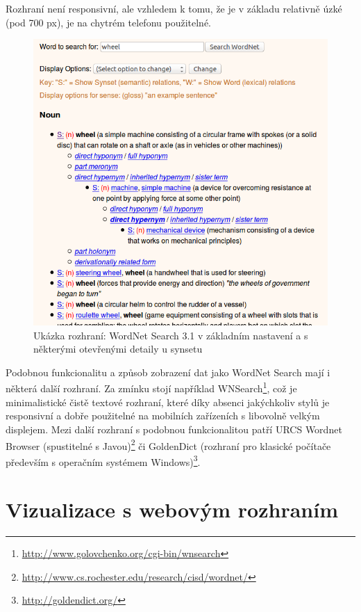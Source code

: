 \documentclass[a4paper, 11pt, oneside]{book}
\begin{document}
				Rozhraní není responsivní, ale vzhledem k tomu, že je v základu relativně úzké (pod 700 px), je na chytrém telefonu použitelné.

				\begin{figure}[h]
					\centering
					\includegraphics[width=1.0\textwidth]{wnsearch.png}
					\caption{Ukázka rozhraní: WordNet Search 3.1 v základním nastavení a s některými otevřenými detaily u synsetu}
					\label{fig:wnsearch}
				\end{figure}

				Podobnou funkcionalitu a způsob zobrazení dat jako WordNet Search mají i některá další rozhraní. Za zmínku stojí například WNSearch\footnote{\url{http://www.golovchenko.org/cgi-bin/wnsearch}}, což je minimalistické čistě textové rozhraní, které díky absenci jakýchkoliv stylů je responsivní a dobře použitelné na mobilních zařízeních s libovolně velkým displejem. Mezi další rozhraní s podobnou funkcionalitou patří URCS Wordnet Browser (spustitelné s Javou)\footnote{\url{http://www.cs.rochester.edu/research/cisd/wordnet/}} či GoldenDict (rozhraní pro klasické počítače především s operačním systémem Windows)\footnote{\url{http://goldendict.org/}}.

		\chapter{Vizualizace s webovým rozhraním}
\end{document}
